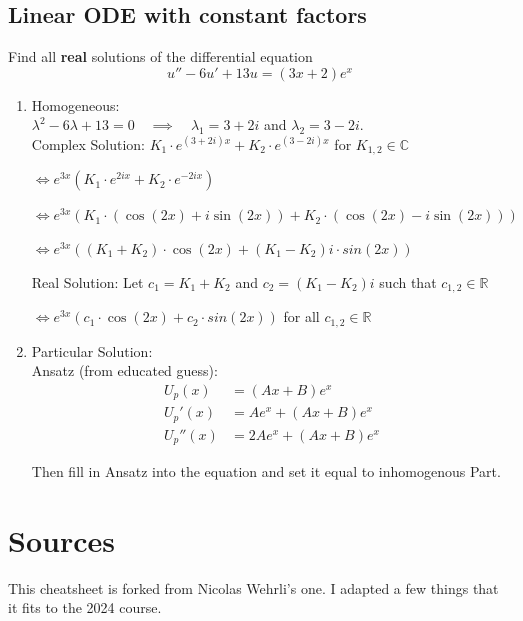 \documentclass[a4paper,fontsize = 10pt]{article}
\begin{document}
\subsection{Linear ODE with constant factors}
  Find all \textbf{real} solutions of the differential equation $$u''-6u'+13u= (3x+2)e^x$$
  \begin{enumerate}
    \item Homogeneous: \\
    $\lambda^2-6\lambda+13 = 0 \quad \implies \quad \lambda_1 = 3 + 2i$ and $\lambda_2 = 3 - 2i$. \\

    Complex Solution: 
    $K_1 \cdot e^{(3+2i)x} + K_2 \cdot e^{(3-2i)x}$ for $K_{1,2}\in \mathbb{C}$
    
    $\iff e^{3x}\left( K_1 \cdot e^{2ix} + K_2 \cdot e^{-2ix} \right)$
    
    $\iff e^{3x}\left( K_1 \cdot \left( \cos(2x) + i \sin(2x) \right) + K_2 \cdot \left( \cos(2x) - i \sin(2x) \right) \right)$
    
    $\iff e^{3x}\left( (K_1+K_2) \cdot \cos(2x) + (K_1-K_2)i \cdot sin(2x) \right)$

    Real Solution: Let $c_1 = K_1 + K_2$ and $c_2 = (K_1-K_2)i$ such that $c_{1,2} \in \mathbb{R}$

    $\iff e^{3x}\left( c_1 \cdot \cos(2x) + c_2 \cdot sin(2x) \right)$ for all $c_{1,2} \in \mathbb{R}$
    
    \item Particular Solution: \\
    Ansatz (from educated guess): 
    \[
      \begin{aligned}
          U_p(x) &= (Ax + B)e^x \\
          U_p'(x) &= A e^x + (Ax + B)e^x \\
          U_p''(x) &= 2A e^x + (Ax + B)e^x
      \end{aligned}
    \]

    Then fill in Ansatz into the equation and set it equal to inhomogenous Part. 

  \end{enumerate}


\section{Sources}
This cheatsheet is forked from Nicolas Wehrli's one. I adapted a few things that it fits to the 2024 course. 
\end{document}
